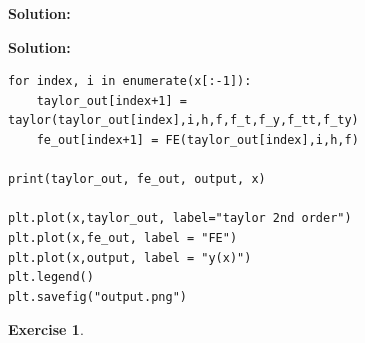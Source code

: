 \documentclass[a4paper,12pt]{scrartcl} %
\newenvironment{solution}
  {\par\color{answercolor}\textbf{Solution:}\ }
  {\par}
\newcounter{customcounter}
\theoremstyle{darktheorem}
\newtheorem{exercise}[customcounter]{Exercise}
\begin{document}
\begin{solution}
\begin{solution}
\begin{enumerate}
\begin{lstlisting}
for index, i in enumerate(x[:-1]):
    taylor_out[index+1] = taylor(taylor_out[index],i,h,f,f_t,f_y,f_tt,f_ty)
    fe_out[index+1] = FE(taylor_out[index],i,h,f)

print(taylor_out, fe_out, output, x)

plt.plot(x,taylor_out, label="taylor 2nd order")
plt.plot(x,fe_out, label = "FE")
plt.plot(x,output, label = "y(x)")
plt.legend()
plt.savefig("output.png")

           \end{lstlisting}
        \end{enumerate}
    \end{solution}
\end{solution}

\begin{exercise}
\end{exercise}
\end{document}
